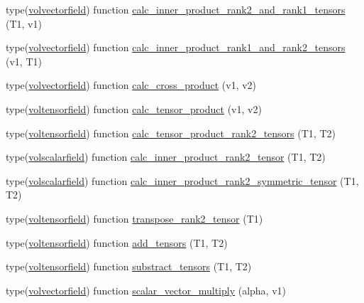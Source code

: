 \begin{DoxyCompactItemize}
\item 
type(\hyperlink{structtensor__fields_1_1volvectorfield}{volvectorfield}) function \hyperlink{classtensor__fields_a562e1416d7d4d3f76ee2fdf782c757ac}{calc\-\_\-inner\-\_\-product\-\_\-rank2\-\_\-and\-\_\-rank1\-\_\-tensors} (T1, v1)
\item 
type(\hyperlink{structtensor__fields_1_1volvectorfield}{volvectorfield}) function \hyperlink{classtensor__fields_a0f9de47073841997c46b84fd704ec84d}{calc\-\_\-inner\-\_\-product\-\_\-rank1\-\_\-and\-\_\-rank2\-\_\-tensors} (v1, T1)
\item 
type(\hyperlink{structtensor__fields_1_1volvectorfield}{volvectorfield}) function \hyperlink{classtensor__fields_a0f93eba8884a1cdec880a76879e6e86c}{calc\-\_\-cross\-\_\-product} (v1, v2)
\item 
type(\hyperlink{structtensor__fields_1_1voltensorfield}{voltensorfield}) function \hyperlink{classtensor__fields_a37d6c514ecd5951e961ff2dd9b47f0f5}{calc\-\_\-tensor\-\_\-product} (v1, v2)
\item 
type(\hyperlink{structtensor__fields_1_1voltensorfield}{voltensorfield}) function \hyperlink{classtensor__fields_acd6ff917ee80439503759ede0db5cf5b}{calc\-\_\-tensor\-\_\-product\-\_\-rank2\-\_\-tensors} (T1, T2)
\item 
type(\hyperlink{structtensor__fields_1_1volscalarfield}{volscalarfield}) function \hyperlink{classtensor__fields_a6c4ad8de3bbbf4cc737aaf39f22b0427}{calc\-\_\-inner\-\_\-product\-\_\-rank2\-\_\-tensor} (T1, T2)
\item 
type(\hyperlink{structtensor__fields_1_1volscalarfield}{volscalarfield}) function \hyperlink{classtensor__fields_a2b6b258978be49fee7e8d55327006a0a}{calc\-\_\-inner\-\_\-product\-\_\-rank2\-\_\-symmetric\-\_\-tensor} (T1, T2)
\item 
type(\hyperlink{structtensor__fields_1_1voltensorfield}{voltensorfield}) function \hyperlink{classtensor__fields_a1dc0528667ffde3ad78991670c841626}{transpose\-\_\-rank2\-\_\-tensor} (T1)
\item 
type(\hyperlink{structtensor__fields_1_1voltensorfield}{voltensorfield}) function \hyperlink{classtensor__fields_ab8fbf252b30a321eceaa830b08f8e50d}{add\-\_\-tensors} (T1, T2)
\item 
type(\hyperlink{structtensor__fields_1_1voltensorfield}{voltensorfield}) function \hyperlink{classtensor__fields_a4fbf70b280e9de73607629453623b025}{substract\-\_\-tensors} (T1, T2)
\item 
type(\hyperlink{structtensor__fields_1_1volvectorfield}{volvectorfield}) function \hyperlink{classtensor__fields_a98d1b3df637ac589e5161944d62512dd}{scalar\-\_\-vector\-\_\-multiply} (alpha, v1)

\end{DoxyCompactItemize}
